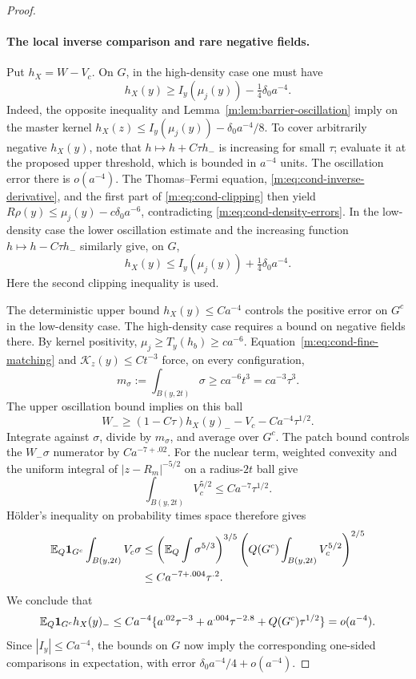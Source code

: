\begin{proof}
\paragraph{The local inverse comparison and rare negative fields.}
Put $h_X=W-V_c$. On $G$, in the high-density case one must have
\begin{equation}\label{m:eq:cond-good-high}
 h_X(y)\ge I_y(\mu_j(y))-\tfrac14\delta_0a^{-4}.
\end{equation}
Indeed, the opposite inequality and
Lemma~\ref{m:lem:barrier-oscillation} imply on the master kernel
$h_X(z)\le I_y(\mu_j(y))-\delta_0a^{-4}/8$.
To cover arbitrarily negative $h_X(y)$, note that
$h\mapsto h+C\tau h_-$ is increasing for small $\tau$; evaluate it
at the proposed upper threshold, which is bounded in $a^{-4}$ units.
The oscillation error there is $o(a^{-4})$.
The Thomas--Fermi equation, \eqref{m:eq:cond-inverse-derivative}, and
the first part of \eqref{m:eq:cond-clipping} then yield
$R\rho(y)\le\mu_j(y)-c\delta_0a^{-6}$, contradicting
\eqref{m:eq:cond-density-errors}.
In the low-density case the lower oscillation estimate and the
increasing function $h\mapsto h-C\tau h_-$ similarly give, on $G$,
\begin{equation}\label{m:eq:cond-good-low}
 h_X(y)\le I_y(\mu_j(y))+\tfrac14\delta_0a^{-4}.
\end{equation}
Here the second clipping inequality is used.

The deterministic upper bound $h_X(y)\le Ca^{-4}$ controls the
positive error on $G^c$ in the low-density case. The high-density case
requires a bound on negative fields there. By kernel positivity,
$\mu_j\ge T_y(h_b)\ge ca^{-6}$. Equation~\eqref{m:eq:cond-fine-matching}
and $\mathcal K_z(y)\le Ct^{-3}$ force, on every configuration,
\[
 m_\sigma:=\int_{B(y,2t)}\sigma\ge ca^{-6}t^3=ca^{-3}\tau^3.
\]
The upper oscillation bound implies on this ball
\[
 W_-\ge(1-C\tau)h_X(y)_--V_c-Ca^{-4}\tau^{1/2}.
\]
Integrate against $\sigma$, divide by $m_\sigma$, and average over
$G^c$. The patch bound controls the $W_-\sigma$ numerator by
$Ca^{-7+.02}$. For the nuclear term, weighted convexity and the
uniform integral of $|z-R_m|^{-5/2}$ on a radius-$2t$ ball give
\[
 \int_{B(y,2t)}V_c^{5/2}\le Ca^{-7}\tau^{1/2}.
\]
H\"older's inequality on probability times space therefore gives
\[
 \begin{split}
 \mathbb E_Q\mathbf 1_{G^c}\int_{B(y,2t)}V_c\sigma
 &\le\left(\mathbb E_Q\int\sigma^{5/3}\right)^{3/5}
       \left(Q(G^c)\int_{B(y,2t)}V_c^{5/2}\right)^{2/5}\\
 &\le Ca^{-7+.004}\tau^{.2}.
 \end{split}
\]
We conclude that
\begin{equation}\label{m:eq:cond-negative-error}
 \mathbb E_Q\mathbf 1_{G^c}h_X(y)_-
 \le Ca^{-4}\{a^{.02}\tau^{-3}+a^{.004}\tau^{-2.8}
                              +Q(G^c)\tau^{1/2}\}=o(a^{-4}).
\end{equation}
Since $|I_y|\le Ca^{-4}$, the bounds on $G$ now imply the
corresponding one-sided comparisons in expectation, with error
$\delta_0a^{-4}/4+o(a^{-4})$.


\end{proof}
